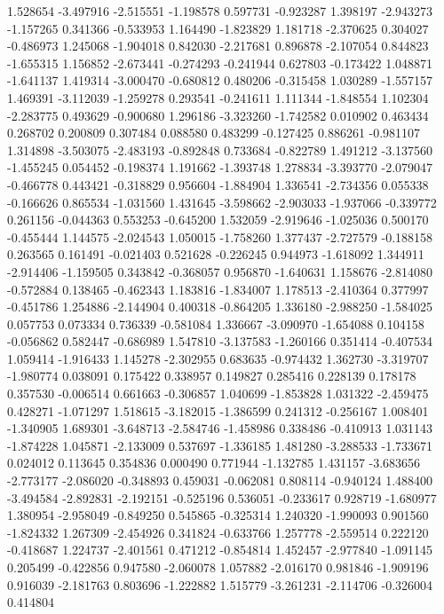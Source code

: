 1.528654
-3.497916
-2.515551
-1.198578
0.597731
-0.923287
1.398197
-2.943273
-1.157265
0.341366
-0.533953
1.164490
-1.823829
1.181718
-2.370625
0.304027
-0.486973
1.245068
-1.904018
0.842030
-2.217681
0.896878
-2.107054
0.844823
-1.655315
1.156852
-2.673441
-0.274293
-0.241944
0.627803
-0.173422
1.048871
-1.641137
1.419314
-3.000470
-0.680812
0.480206
-0.315458
1.030289
-1.557157
1.469391
-3.112039
-1.259278
0.293541
-0.241611
1.111344
-1.848554
1.102304
-2.283775
0.493629
-0.900680
1.296186
-3.323260
-1.742582
0.010902
0.463434
0.268702
0.200809
0.307484
0.088580
0.483299
-0.127425
0.886261
-0.981107
1.314898
-3.503075
-2.483193
-0.892848
0.733684
-0.822789
1.491212
-3.137560
-1.455245
0.054452
-0.198374
1.191662
-1.393748
1.278834
-3.393770
-2.079047
-0.466778
0.443421
-0.318829
0.956604
-1.884904
1.336541
-2.734356
0.055338
-0.166626
0.865534
-1.031560
1.431645
-3.598662
-2.903033
-1.937066
-0.339772
0.261156
-0.044363
0.553253
-0.645200
1.532059
-2.919646
-1.025036
0.500170
-0.455444
1.144575
-2.024543
1.050015
-1.758260
1.377437
-2.727579
-0.188158
0.263565
0.161491
-0.021403
0.521628
-0.226245
0.944973
-1.618092
1.344911
-2.914406
-1.159505
0.343842
-0.368057
0.956870
-1.640631
1.158676
-2.814080
-0.572884
0.138465
-0.462343
1.183816
-1.834007
1.178513
-2.410364
0.377997
-0.451786
1.254886
-2.144904
0.400318
-0.864205
1.336180
-2.988250
-1.584025
0.057753
0.073334
0.736339
-0.581084
1.336667
-3.090970
-1.654088
0.104158
-0.056862
0.582447
-0.686989
1.547810
-3.137583
-1.260166
0.351414
-0.407534
1.059414
-1.916433
1.145278
-2.302955
0.683635
-0.974432
1.362730
-3.319707
-1.980774
0.038091
0.175422
0.338957
0.149827
0.285416
0.228139
0.178178
0.357530
-0.006514
0.661663
-0.306857
1.040699
-1.853828
1.031322
-2.459475
0.428271
-1.071297
1.518615
-3.182015
-1.386599
0.241312
-0.256167
1.008401
-1.340905
1.689301
-3.648713
-2.584746
-1.458986
0.338486
-0.410913
1.031143
-1.874228
1.045871
-2.133009
0.537697
-1.336185
1.481280
-3.288533
-1.733671
0.024012
0.113645
0.354836
0.000490
0.771944
-1.132785
1.431157
-3.683656
-2.773177
-2.086020
-0.348893
0.459031
-0.062081
0.808114
-0.940124
1.488400
-3.494584
-2.892831
-2.192151
-0.525196
0.536051
-0.233617
0.928719
-1.680977
1.380954
-2.958049
-0.849250
0.545865
-0.325314
1.240320
-1.990093
0.901560
-1.824332
1.267309
-2.454926
0.341824
-0.633766
1.257778
-2.559514
0.222120
-0.418687
1.224737
-2.401561
0.471212
-0.854814
1.452457
-2.977840
-1.091145
0.205499
-0.422856
0.947580
-2.060078
1.057882
-2.016170
0.981846
-1.909196
0.916039
-2.181763
0.803696
-1.222882
1.515779
-3.261231
-2.114706
-0.326004
0.414804
